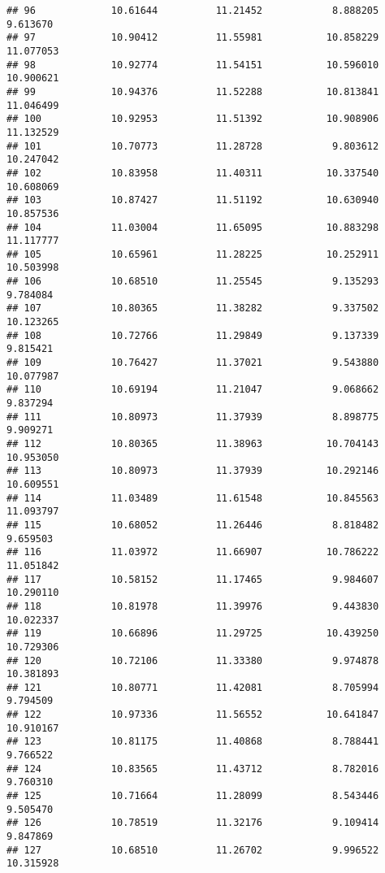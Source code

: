 \documentclass[
]{article}
\begin{document}
\begin{verbatim}
## 96             10.61644          11.21452            8.888205          9.613670
## 97             10.90412          11.55981           10.858229         11.077053
## 98             10.92774          11.54151           10.596010         10.900621
## 99             10.94376          11.52288           10.813841         11.046499
## 100            10.92953          11.51392           10.908906         11.132529
## 101            10.70773          11.28728            9.803612         10.247042
## 102            10.83958          11.40311           10.337540         10.608069
## 103            10.87427          11.51192           10.630940         10.857536
## 104            11.03004          11.65095           10.883298         11.117777
## 105            10.65961          11.28225           10.252911         10.503998
## 106            10.68510          11.25545            9.135293          9.784084
## 107            10.80365          11.38282            9.337502         10.123265
## 108            10.72766          11.29849            9.137339          9.815421
## 109            10.76427          11.37021            9.543880         10.077987
## 110            10.69194          11.21047            9.068662          9.837294
## 111            10.80973          11.37939            8.898775          9.909271
## 112            10.80365          11.38963           10.704143         10.953050
## 113            10.80973          11.37939           10.292146         10.609551
## 114            11.03489          11.61548           10.845563         11.093797
## 115            10.68052          11.26446            8.818482          9.659503
## 116            11.03972          11.66907           10.786222         11.051842
## 117            10.58152          11.17465            9.984607         10.290110
## 118            10.81978          11.39976            9.443830         10.022337
## 119            10.66896          11.29725           10.439250         10.729306
## 120            10.72106          11.33380            9.974878         10.381893
## 121            10.80771          11.42081            8.705994          9.794509
## 122            10.97336          11.56552           10.641847         10.910167
## 123            10.81175          11.40868            8.788441          9.766522
## 124            10.83565          11.43712            8.782016          9.760310
## 125            10.71664          11.28099            8.543446          9.505470
## 126            10.78519          11.32176            9.109414          9.847869
## 127            10.68510          11.26702            9.996522         10.315928

\end{verbatim}
\end{document}
